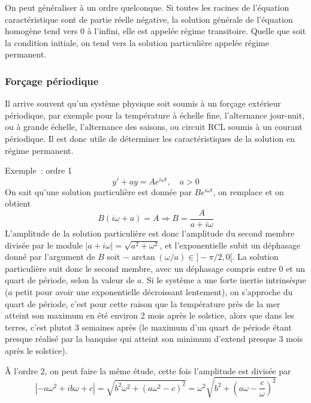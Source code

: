 \documentclass[a4paper,11pt]{article}
\begin{document}
\begin{giacjshere}
On peut g\'en\'eraliser \`a un ordre quelconque.
Si toutes les racines de l'\'equation caract\'eristique sont
de partie r\'eelle n\'egative, la solution g\'en\'erale
de l'\'equation homog\`ene tend vers 0 \`a l'infini,
elle est appel\'ee r\'egime transitoire. Quelle que
soit la condition initiale, on tend vers la solution particuli\`ere
appel\'ee r\'egime permanent.

\subsubsection{For\c{c}age p\'eriodique}
Il arrive souvent qu'un syst\`eme physique soit soumis \`a
un for\c{c}age ext\'erieur p\'eriodique, par exemple
pour la temp\'erature \`a \'echelle fine, l'alternance jour-nuit,
ou \`a grande \'echelle, l'alternance des saisons, ou
circuit RCL soumis \`a un courant p\'eriodique. Il est donc
utile de d\'eterminer les caract\'eristiques de la solution
en r\'egime permanent.

Exemple~: ordre 1
$$ y'+ay=A e^{i\omega t}, \quad a>0$$
On sait qu'une solution particuli\`ere est donn\'ee par
$ B e^{i \omega t}$, on remplace et on obtient
$$ B(i\omega +a)=A \Rightarrow B=\frac{A}{a+i\omega}$$
L'amplitude de la solution particuli\`ere est donc l'amplitude
du second membre divis\'ee par le module 
$|a+i\omega|=\sqrt{a^2+\omega^2}$, et l'exponentielle subit
un d\'ephasage donn\'e par l'argument de $B$ soit
$-\arctan(\omega/a) \in ]-\pi/2,0[$. La solution
particuli\`ere suit donc le second membre, avec un d\'ephasage
compris entre 0 et un quart de p\'eriode, selon la valeur de $a$.
Si le syst\`eme a une forte inertie intrins\`eque ($a$ petit
pour avoir une exponentielle d\'ecroissant lentement), on s'approche
du quart de p\'eriode, c'est pour cette raison que la temp\'erature
pr\`es de la mer atteint son maximum en \'et\'e environ 2 mois
apr\`es le solstice, alors que dans les terres, c'est plutot 3
semaines apr\`es (le maximum d'un quart de p\'eriode
\'etant presque r\'ealis\'e par la banquise qui atteint son
minimum d'extend presque 3 mois apr\`es le solstice).

\`A l'ordre 2, on peut faire la m\^eme \'etude, cette fois l'amplitude
est divis\'ee par
$$|-a\omega^2+ib\omega+c|
=\sqrt{ b^2\omega^2+(a\omega^2-c)^2}
=\omega^2 \sqrt{ b^2+(a\omega-\frac{c}{\omega})^2}$$


\end{giacjshere}
\end{document}

